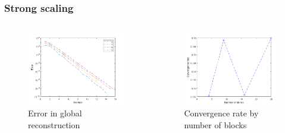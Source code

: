 \documentclass{beamer}
\begin{document}
\begin{frame}
\frametitle{Strong scaling}

\begin{columns}
	\begin{column}{0.5\textwidth}
		\begin{figure}
			\includegraphics[width=\textwidth]{FIG/MTLB_blocks_strong_error.png}
			\caption{Error in global reconstruction}
		\end{figure}
	\end{column}
	\begin{column}{0.5\textwidth}
		\begin{figure}
			\includegraphics[width=\textwidth]{FIG/MTLB_blocks_strong_conv.png}
			\caption{Convergence rate by number of blocks}
		\end{figure}
	\end{column}
\end{columns}

\end{frame}
\end{document}
